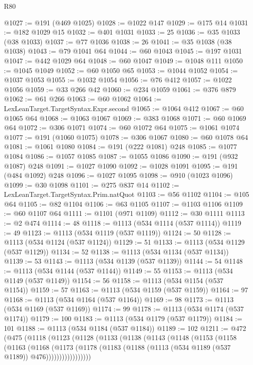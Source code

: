 \begin{lexlean}{R80}
\begin{coremodule}
@1027 := @191 (@469 @1025)
@1028 := @1022 @147
@1029 := @175 @14
@1031 := @182 @1029 @15
@1032 := @401 @1031
@1033 := 25
@1036 := @35 @1033 (@38 @1033)
@1037 := @77 @1036
@1038 := 26
@1041 := @35 @1038 (@38 @1038)
@1043 := @79 @1041 @64
@1044 := @60 @1043
@1045 := @197 @1031
@1047 := @442 @1029 @64
@1048 := @60 @1047
@1049 := @1048 @111
@1050 := @1045 @1049
@1052 := @60 @1050 @65
@1053 := @1044 @1052
@1054 := @1037 @1053
@1055 := @1032 @1054
@1056 := @76 @412
@1057 := @1022 @1056
@1059 := @33 @266 @42
@1060 := @234 @1059
@1061 := @376 @879
@1062 := @61 @266
@1063 := @60 @1062
@1064 := LexLeanTarget.TargetSyntax.Expr.second
@1065 := @1064 @412
@1067 := @60 @1065 @64
@1068 := @1063 @1067
@1069 := @383 @1068
@1071 := @60 @1069 @64
@1072 := @306 @1071
@1074 := @60 @1072 @64
@1075 := @1061 @1074
@1077 := @191 (@1060 @1075)
@1078 := @306 @1067
@1080 := @60 @1078 @64
@1081 := @1061 @1080
@1084 := @191 (@222 @1081) @248
@1085 := @1077 @1084
@1086 := @1057 @1085
@1087 := @1055 @1086
@1090 := @191 (@932 @1087) @248
@1091 := @1027 @1090
@1092 := @1028 @1091
@1095 := @191 (@484 @1092) @248
@1096 := @1027 @1095
@1098 := @910 (@1023 @1096)
@1099 := @30 @1098
@1101 := @275 @837 @14
@1102 := LexLeanTarget.TargetSyntax.Prim.natQuot
@1103 := @56 @1102
@1104 := @105 @64
@1105 := @82 @1104
@1106 := @63 @1105
@1107 := @1103 @1106
@1109 := @60 @1107 @64
@1111 := @1101 (@971 @1109)
@1112 := @30 @1111
@1113 := @2 @474
@1114 := 48
@1118 := @1113 (@534 @1114 (@537 @1114))
@1119 := 49
@1123 := @1113 (@534 @1119 (@537 @1119))
@1124 := 50
@1128 := @1113 (@534 @1124 (@537 @1124))
@1129 := 51
@1133 := @1113 (@534 @1129 (@537 @1129))
@1134 := 52
@1138 := @1113 (@534 @1134 (@537 @1134))
@1139 := 53
@1143 := @1113 (@534 @1139 (@537 @1139))
@1144 := 54
@1148 := @1113 (@534 @1144 (@537 @1144))
@1149 := 55
@1153 := @1113 (@534 @1149 (@537 @1149))
@1154 := 56
@1158 := @1113 (@534 @1154 (@537 @1154))
@1159 := 57
@1163 := @1113 (@534 @1159 (@537 @1159))
@1164 := 97
@1168 := @1113 (@534 @1164 (@537 @1164))
@1169 := 98
@1173 := @1113 (@534 @1169 (@537 @1169))
@1174 := 99
@1178 := @1113 (@534 @1174 (@537 @1174))
@1179 := 100
@1183 := @1113 (@534 @1179 (@537 @1179))
@1184 := 101
@1188 := @1113 (@534 @1184 (@537 @1184))
@1189 := 102
@1211 := @472
    (@475
      (@1118
        (@1123
          (@1128
            (@1133
              (@1138
                (@1143
                  (@1148
                    (@1153
                      (@1158
                        (@1163
                          (@1168
                            (@1173
                              (@1178
                                (@1183 (@1188 (@1113 (@534 @1189 (@537 @1189)) @476)))))))))))))))))

\end{coremodule}
\end{lexlean}
